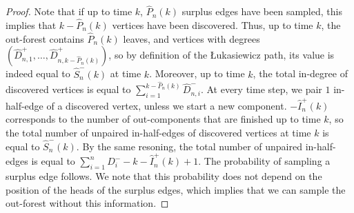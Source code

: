 \begin{proof}
Note that if up to time $k$, $\hat{P}_n(k)$ surplus edges have been sampled, this implies that $k-\hat{P}_n(k)$ vertices have been discovered. Thus, up to time $k$, the out-forest contains $\hat{P}_n(k)$ leaves, and vertices with degrees $(\hat{D}^+_{n,1},\dots,\hat{D}^+_{n,k-\hat{P}_n(k)})$, so by definition of the \L ukasiewicz path, its value is indeed equal to $\hat{S}^-_n(k)$ at time $k$. Moreover, up to time $k$, the total in-degree of discovered vertices is equal to $\sum_{i=1}^{k-\hat{P}_n(k)}\hat{D}^-_{n,i}$. At every time step, we pair $1$ in-half-edge of a discovered vertex, unless we start a new component. $-\hat{I}^+_n(k)$ corresponds to the number of out-components that are finished up to time $k$, so the total number of unpaired in-half-edges of discovered vertices at time $k$ is equal to $\hat{S}^-_n(k)$. By the same resoning, the total number of unpaired in-half-edges is equal to $\sum_{i=1}^n D^-_i-k-\hat{I}^+_n(k)+1$. The probability of sampling a surplus edge follows. We note that this probability does not depend on the position of the heads of the surplus edges, which implies that we can sample the out-forest without this information.
\end{proof}
